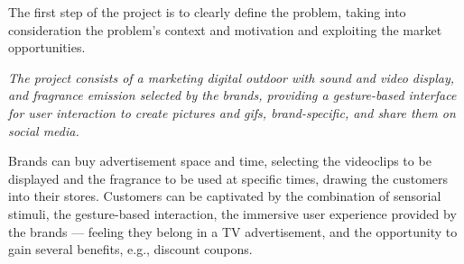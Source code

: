 The first step of the project is to clearly define the problem, taking into
consideration the problem's context and motivation and exploiting the market opportunities.

\emph{The project consists of a marketing digital outdoor with sound and
video display, and fragrance emission selected by the brands, providing a gesture-based interface for
user interaction to create pictures and \gls{gif}s, brand-specific, and share them on
social media.}

Brands can buy advertisement space and time, selecting the videoclips to be
displayed and the fragrance to be used at specific times, drawing the customers
into their stores. Customers can be captivated by the combination of sensorial
stimuli, the gesture-based interaction, the immersive user experience provided
by the brands --- feeling they belong in a TV advertisement, and the opportunity
to gain several benefits, e.g., discount coupons.
